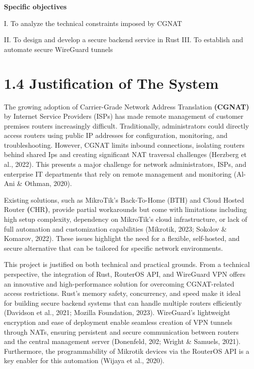 \documentclass[12pt,a4paper,oneside]{report}
\begin{document}
\textbf{Specific objectives}




I. To analyze the technical constraints imposed by CGNAT


II. To design and develop a secure backend service in Rust III. To establish and automate secure WireGuard tunnels




\section{1.4 Justification of The System}

The growing adoption of Carrier-Grade Network Address Translation \textbf{(CGNAT) }by Internet Service Providers (ISPs) has made remote management of customer premises routers increasingly difficult. Traditionally, administrators could directly access routers using public IP addresses for configuration, monitoring, and troubleshooting. However, CGNAT limits inbound connections, isolating routers behind shared Ips and creating significant NAT traversal challenges (Herzberg et al., 2022). This presents a major challenge for network administrators, ISPs, and enterprise IT departments that rely on remote management and monitoring (Al-Ani \& Othman, 2020).


Existing solutions, such as MikroTik's Back-To-Home (BTH) and Cloud Hosted Router \textbf{(}CHR\textbf{)}, provide partial workarounds but come with limitations including high setup complexity, dependency on MikroTik's cloud infrastructure, or lack of full automation and customization capabilities (Mikrotik, 2023; Sokolov \& Komarov, 2022). These issues highlight the need for a flexible, self-hosted, and secure alternative that can be tailored for specific network environments.


This project is justified on both technical and practical grounds. From a technical perspective, the integration of Rust, RouterOS API, and WireGuard VPN offers an innovative and high-performance solution for overcoming CGNAT-related access restrictions. Rust's memory safety, concurrency, and speed make it ideal for building secure backend systems that can handle multiple routers efficiently (Davidson et al., 2021; Mozilla Foundation, 2023). WireGuard's lightweight encryption and ease of deployment enable seamless creation of VPN tunnels through NATs, ensuring persistent and secure communication between routers and the central management server (Donenfeld, 202; Wright \& Samuels, 2021). Furthermore, the programmability of Mikrotik devices via the RouterOS API is a key enabler for this automation (Wijaya et al., 2020).
\end{document}
